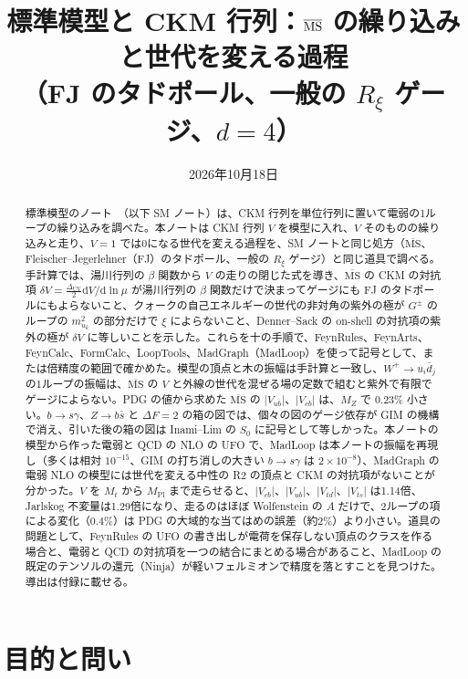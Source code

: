 \documentclass[a4paper,10pt]{ltjsarticle}
\title{標準模型と CKM 行列：$\MSbar$ の繰り込みと世代を変える過程\\（FJ のタドポール、一般の $R_\xi$ ゲージ、$d=4$）}
\author{}
\date{2026年10月18日}
\newcommand{\dd}{\mathrm{d}}
\newcommand{\MSbar}{\overline{\mathrm{MS}}}
\newcommand{\DUV}{\Delta_{\mathrm{UV}}}
\begin{document}
\maketitle

\begin{abstract}
標準模型のノート~\cite{smnote}（以下 SM ノート）は、CKM 行列を単位行列に置いて電弱の1ループの繰り込みを調べた。本ノートは CKM 行列 $V$ を模型に入れ、$V$ そのものの繰り込みと走り、$V=1$ では0になる世代を変える過程を、SM ノートと同じ処方（$\MSbar$、Fleischer--Jegerlehner（FJ）のタドポール、一般の $R_\xi$ ゲージ）と同じ道具で調べる。手計算では、湯川行列の $\beta$ 関数から $V$ の走りの閉じた式を導き、$\MSbar$ の CKM の対抗項 $\delta V=\frac{\DUV}2\dd V/\dd\ln\mu$ が湯川行列の $\beta$ 関数だけで決まってゲージにも FJ のタドポールにもよらないこと、クォークの自己エネルギーの世代の非対角の紫外の極が $G^\pm$ のループの $m_{u_k}^2$ の部分だけで $\xi$ によらないこと、Denner--Sack の on-shell の対抗項の紫外の極が $\delta V$ に等しいことを示した。これらを十の手順で、FeynRules、FeynArts、FeynCalc、FormCalc、LoopTools、MadGraph（MadLoop）を使って記号として、または倍精度の範囲で確かめた。模型の頂点と木の振幅は手計算と一致し、$W^+\to u_i\bar d_j$ の1ループの振幅は、$\MSbar$ の $V$ と外線の世代を混ぜる場の定数で組むと紫外で有限でゲージによらない。PDG の値から求めた $\MSbar$ の $|V_{ub}|$、$|V_{cb}|$ は、$M_Z$ で $0.23\%$ 小さい。$b\to s\gamma$、$Z\to b\bar s$ と $\Delta F=2$ の箱の図では、個々の図のゲージ依存が GIM の機構で消え、引いた後の箱の図は Inami--Lim の $S_0$ に記号として等しかった。本ノートの模型から作った電弱と QCD の NLO の UFO で、MadLoop は本ノートの振幅を再現し（多くは相対 $10^{-15}$、GIM の打ち消しの大きい $b\to s\gamma$ は $2\times10^{-8}$）、MadGraph の電弱 NLO の模型には世代を変える中性の R2 の頂点と CKM の対抗項がないことが分かった。$V$ を $M_t$ から $M_{\mathrm{Pl}}$ まで走らせると、$|V_{cb}|$、$|V_{ub}|$、$|V_{td}|$、$|V_{ts}|$ は1.14倍、Jarlskog 不変量は1.29倍になり、走るのはほぼ Wolfenstein の $A$ だけで、2ループの項による変化（$0.4\%$）は PDG の大域的な当てはめの誤差（約2\%）より小さい。道具の問題として、FeynRules の UFO の書き出しが電荷を保存しない頂点のクラスを作る場合と、電弱と QCD の対抗項を一つの結合にまとめる場合があること、MadLoop の既定のテンソルの還元（Ninja）が軽いフェルミオンで精度を落とすことを見つけた。導出は付録に載せる。
\end{abstract}

\tableofcontents

\section{目的と問い}\label{sec:intro}
\end{document}
